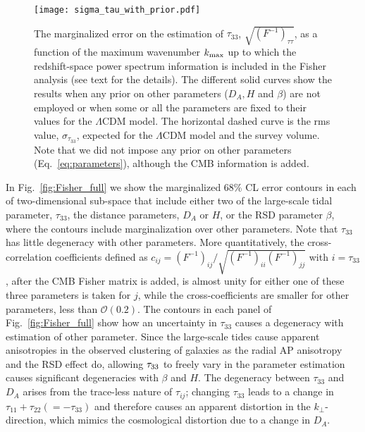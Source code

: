 \documentclass[prd,onecolumn,notitlepage,amsmath,amssymb,floatfix,superscriptaddress]{revtex4-1}
\begin{document}
\begin{figure}
\begin{center}
	\texttt{[image: sigma\_tau\_with\_prior.pdf]}
	\caption{The marginalized error on the estimation of $\tau_{33}$, 
	$\sqrt{(F^{-1})_{\tau\tau}}$, as a function of the maximum wavenumber $k_{\rm max}$ 
	up to which the redshift-space power spectrum
	information is included in the Fisher analysis (see text for the details). The different solid curves show the results when any prior on other 
	parameters ($D_A, H$ and $\beta$) are not employed or when some or all the parameters are fixed to their values for the $\Lambda$CDM model. 
	The horizontal dashed curve is the rms value, $\sigma_{\tau_{33}}$, expected for the $\Lambda$CDM model and the survey volume. 
	Note that we did not impose any prior on other parameters (Eq.~\ref{eq:parameters}), although the CMB information is added. 
	}
	\label{fig:F_inv_tau}
\end{center}
\end{figure}

In Fig.~\ref{fig:Fisher_full} we show the marginalized 68\% CL error contours in each of two-dimensional sub-space that include either two of
 the large-scale tidal parameter, $\tau_{33}$, the
distance parameters, $D_A$ or $H$, or the RSD parameter $\beta$, where the contours include marginalization over other 
parameters. Note that $\tau_{33}$ has little degeneracy with other parameters. More quantitatively, 
 the cross-correlation coefficients defined as $c_{ij}=(F^{-1})_{ij}/\sqrt{(F^{-1})_{ii}(F^{-1})_{jj}}$ with $i={\tau_{33}}$, after the CMB Fisher matrix is added, 
is almost unity for either one of
these three parameters is taken for $j$, while the cross-coefficients are smaller for other parameters, less than $\mathcal{O}(0.2)$.
The contours in each panel of Fig.~\ref{fig:Fisher_full} show how an uncertainty in $\tau_{33}$ causes a degeneracy with estimation of other parameter. 
Since the large-scale tides cause apparent anisotropies in the observed clustering of galaxies as the radial AP anisotropy and the RSD effect do, allowing $\tau_{\rm 33}$ to freely vary in the parameter estimation causes significant degeneracies with $\beta$ and $H$. The degeneracy between 
$\tau_{33}$ and $D_A$ arises from the trace-less nature of $\tau_{ij}$; changing $\tau_{33}$ leads to a change in $\tau_{11}+\tau_{22}(=-\tau_{33})$ and  therefore  causes an apparent distortion in the $k_{\perp}$-direction, which mimics the cosmological distortion due to a change in $D_A$.
\end{document}
